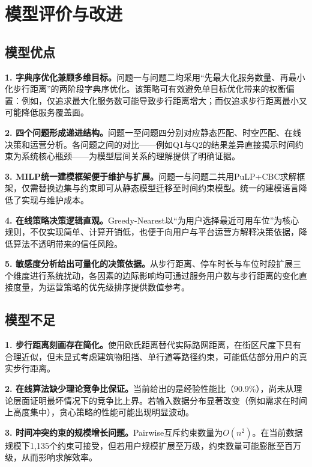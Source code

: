 \documentclass[12pt,a4paper]{ctexart}
\begin{document}

\section{模型评价与改进}

\subsection{模型优点}

\textbf{1. 字典序优化兼顾多维目标。}问题一与问题二均采用``先最大化服务数量、再最小化步行距离''的两阶段字典序优化。该策略可有效避免单目标优化带来的权衡偏置：例如，仅追求最大化服务数可能导致步行距离增大；而仅追求步行距离最小又可能降低服务覆盖面。

\textbf{2. 四个问题形成递进结构。}问题一至问题四分别对应静态匹配、时空匹配、在线决策和运营分析。各问题之间的对比——例如Q1与Q2的结果差异直接揭示时间约束为系统核心瓶颈——为模型层间关系的理解提供了明确证据。

\textbf{3. MILP统一建模框架便于维护与扩展。}问题一与问题二共用PuLP+CBC求解框架，仅需替换边集与约束即可从静态模型迁移至时间约束模型。统一的建模语言降低了实现与维护成本。

\textbf{4. 在线策略决策逻辑直观。}Greedy-Nearest以``为用户选择最近可用车位''为核心规则，不仅实现简单、计算开销低，也便于向用户与平台运营方解释决策依据，降低算法不透明带来的信任风险。

\textbf{5. 敏感度分析给出可量化的决策依据。}从步行距离、停车时长与车位时段扩展三个维度进行系统扰动，各因素的边际影响均可通过服务用户数与步行距离的变化直接度量，为运营策略的优先级排序提供数值参考。

\subsection{模型不足}

\textbf{1. 步行距离刻画存在简化。}使用欧氏距离替代实际路网距离，在街区尺度下具有合理近似，但未显式考虑建筑物阻挡、单行道等路径约束，可能低估部分用户的真实步行距离。

\textbf{2. 在线算法缺少理论竞争比保证。}当前给出的是经验性能比（90.9\%），尚未从理论层面证明最坏情况下的竞争比上界。若输入数据分布显著改变（例如需求在时间上高度集中），贪心策略的性能可能出现明显波动。

\textbf{3. 时间冲突约束的规模增长问题。}Pairwise互斥约束数量为$O(n^2)$。在当前数据规模下1,135个约束可接受，但若用户规模扩展至万级，约束数量可能膨胀至百万级，从而影响求解效率。
\end{document}
